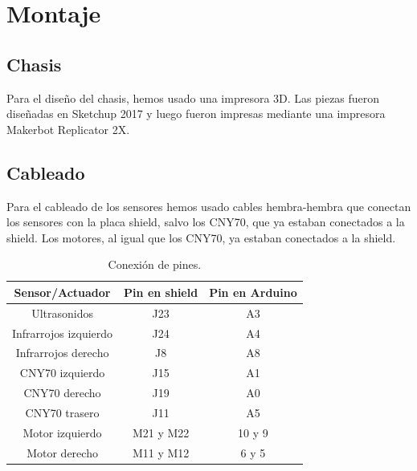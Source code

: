 \chapter{Montaje}
\section{Chasis}
Para el diseño del chasis, hemos usado una impresora 3D. Las piezas fueron diseñadas en Sketchup 2017 y luego fueron impresas mediante una impresora Makerbot Replicator 2X.

\section{Cableado}
Para el cableado de los sensores hemos usado cables hembra-hembra que conectan los sensores con la placa shield, salvo los CNY70, que ya estaban conectados a la shield. Los motores, al igual que los CNY70, ya estaban conectados a la shield.
\begin{table}[htbp]
	\begin{center}
		\begin{tabular}{|c|c|c|}
			\hline 
			\textbf{Sensor/Actuador} & \textbf{Pin en shield} & \textbf{Pin en Arduino}  \\
			\hline
			Ultrasonidos & J23 & A3 \\\hline
			Infrarrojos izquierdo & J24 & A4 \\\hline
			Infrarrojos derecho & J8 & A8 \\\hline
			CNY70 izquierdo & J15 & A1 \\\hline
			CNY70 derecho & J19 & A0 \\\hline
			CNY70 trasero & J11 & A5 \\\hline
			Motor izquierdo & M21 y M22 & 10 y 9 \\\hline
			Motor derecho & M11 y M12 & 6 y 5 \\\hline
		\end{tabular}
		\caption{Conexión de pines.}
		\label{tabla:Conexión de pines}
	\end{center}
\end{table}

